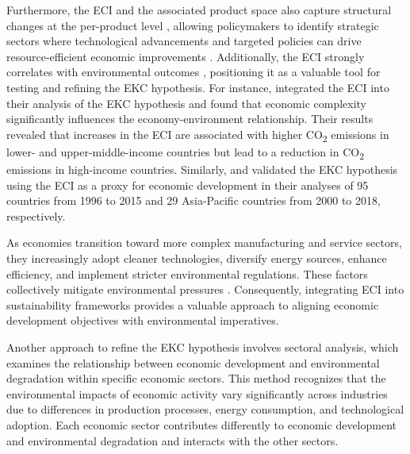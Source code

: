 \documentclass[10pt]{article}
\begin{document}
Furthermore, the ECI and the associated product space also capture structural changes at the per-product level \citep{hidalgoProductSpaceConditions2007}, allowing policymakers to identify strategic sectors where technological advancements and targeted policies can drive resource-efficient economic improvements \citep{hidalgoEconomicComplexityTheory2021}. Additionally, the ECI strongly correlates with environmental outcomes \citep{agozieEnvironmentalKuznetsCurve2022, alvaradoEcologicalFootprintEconomic2021, canEffectExportComposition2022}, positioning it as a valuable tool for testing and refining the EKC hypothesis. For instance, \cite{doganDoesEconomicComplexity2019} integrated the ECI into their analysis of the EKC hypothesis and found that economic complexity significantly influences the economy-environment relationship. Their results revealed that increases in the ECI are associated with higher CO\textsubscript{2} emissions in lower- and upper-middle-income countries but lead to a reduction in CO\textsubscript{2} emissions in high-income countries. Similarly, \cite{youDynamicImpactEconomic2022} and \cite{khezriEnvironmentalImplicationsEconomic2022} validated the EKC hypothesis using the ECI as a proxy for economic development in their analyses of 95 countries from 1996 to 2015 and 29 Asia-Pacific countries from 2000 to 2018, respectively.

As economies transition toward more complex manufacturing and service sectors, they increasingly adopt cleaner technologies, diversify energy sources, enhance efficiency, and implement stricter environmental regulations. These factors collectively mitigate environmental pressures \citep{Ahmad2023Natural, ullahExploringRoleGreen2024}. Consequently, integrating ECI into sustainability frameworks provides a valuable approach to aligning economic development objectives with environmental imperatives.

Another approach to refine the EKC hypothesis involves sectoral analysis, which examines the relationship between economic development and environmental degradation within specific economic sectors. This method recognizes that the environmental impacts of economic activity vary significantly across industries due to differences in production processes, energy consumption, and technological adoption. Each economic sector contributes differently to economic development and environmental degradation and interacts with the other sectors. 
\end{document}
